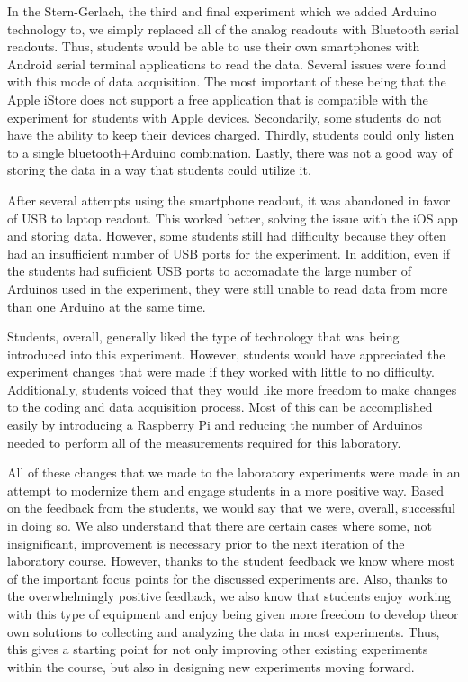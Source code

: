 In the Stern-Gerlach, the third and final experiment which we added Arduino technology to, we simply replaced all of the analog readouts with Bluetooth serial readouts.
Thus, students would be able to use their own smartphones with Android serial terminal applications to read the data.
Several issues were found with this mode of data acquisition.
The most important of these being that the Apple iStore does not support a free application that is compatible with the experiment for students with Apple devices.
Secondarily, some students do not have the ability to keep their devices charged.
Thirdly, students could only listen to a single bluetooth+Arduino combination.
Lastly, there was not a good way of storing the data in a way that students could utilize it.

After several attempts using the smartphone readout, it was abandoned in favor of USB to laptop readout.
This worked better, solving the issue with the iOS app and storing data.
However, some students still had difficulty because they often had an insufficient number of USB ports for the experiment.
In addition, even if the students had sufficient USB ports to accomadate the large number of Arduinos used in the experiment, they were still unable to read data from more than one Arduino at the same time.

Students, overall, generally liked the type of technology that was being introduced into this experiment.
However, students would have appreciated the experiment changes that were made if they worked with little to no difficulty.
Additionally, students voiced that they would like more freedom to make changes to the coding and data acquisition process.
Most of this can be accomplished easily by introducing a Raspberry Pi and reducing the number of Arduinos needed to perform all of the measurements required for this laboratory.

All of these changes that we made to the laboratory experiments were made in an attempt to modernize them and engage students in a more positive way.
Based on the feedback from the students, we would say that we were, overall, successful in doing so.
We also understand that there are certain cases where some, not insignificant, improvement is necessary prior to the next iteration of the laboratory course.
However, thanks to the student feedback we know where most of the important focus points for the discussed experiments are.
Also, thanks to the overwhelmingly positive feedback, we also know that students enjoy working with this type of equipment and enjoy being given more freedom to develop theor own solutions to collecting and analyzing the data in most experiments.
Thus, this gives a starting point for not only improving other existing experiments within the course, but also in designing new experiments moving forward.

